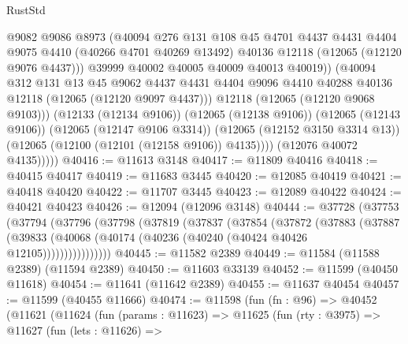 \begin{lexlean}{RustStd}
\begin{coremodule}
                      @9082
                      @9086
                      @8973
                      (@40094
                        @276
                        @131
                        @108
                        @45
                        @4701
                        @4437
                        @4431
                        @4404
                        @9075
                        @4410
                        (@40266 @4701 @40269 @13492)
                        @40136
                        @12118
                        (@12065 (@12120 @9076 @4437)))
                      @39999
                      @40002
                      @40005
                      @40009
                      @40013
                      @40019))
                  (@40094
                    @312
                    @131
                    @13
                    @45
                    @9062
                    @4437
                    @4431
                    @4404
                    @9096
                    @4410
                    @40288
                    @40136
                    @12118
                    (@12065 (@12120 @9097 @4437)))
                  @12118
                  (@12065 (@12120 @9068 @9103)))
                (@12133 (@12134 @9106))
                (@12065 (@12138 @9106))
                (@12065 (@12143 @9106))
                (@12065 (@12147 @9106 @3314))
                (@12065 (@12152 @3150 @3314 @13))
                (@12065 (@12100 (@12101 (@12158 @9106)) @4135))))
            (@12076 @40072 @4135)))))
@40416 := @11613 @3148
@40417 := @11809 @40416
@40418 := @40415 @40417
@40419 := @11683 @3445
@40420 := @12085 @40419
@40421 := @40418 @40420
@40422 := @11707 @3445
@40423 := @12089 @40422
@40424 := @40421 @40423
@40426 := @12094 (@12096 @3148)
@40444 := @37728
    (@37753
      (@37794
        (@37796
          (@37798
            (@37819
              (@37837
                (@37854
                  (@37872
                    (@37883
                      (@37887
                        (@39833
                          (@40068 (@40174 (@40236 (@40240 (@40424 @40426 @12105))))))))))))))))
@40445 := @11582 @2389
@40449 := @11584 (@11588 @2389) (@11594 @2389)
@40450 := @11603 @33139
@40452 := @11599 (@40450 @11618)
@40454 := @11641 (@11642 @2389)
@40455 := @11637 @40454
@40457 := @11599 (@40455 @11666)
@40474 := @11598
    (fun (fn : @96) =>
    @40452
      (@11621
        (@11624
          (fun (params : @11623) =>
          @11625
            (fun (rty : @3975) =>
            @11627
              (fun (lets : @11626) =>

\end{coremodule}
\end{lexlean}
